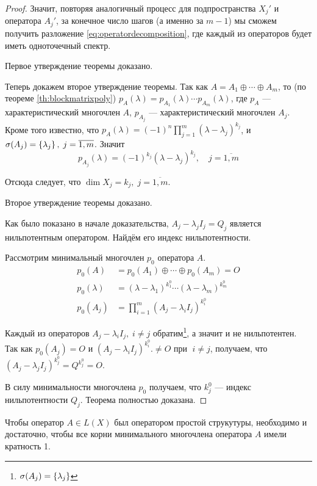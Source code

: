 \begin{proof}
    Значит, повторяя аналогичный процесс для подпространства $X_j'$ и оператора
    $A_j'$, за конечное число шагов (а именно за $m-1$) мы сможем получить разложение
    \eqref{eq:operatordecomposition}, где каждый из операторов будет иметь
    одноточечный спектр.

    Первое утверждение теоремы доказано.

    Теперь докажем второе утверждение теоремы.
    Так как $A = A_1 \oplus \dotsb \oplus A_m$, то (по теореме
    \ref{th:blockmatrixpoly})
    $p_A(\lambda) = p_{A_1}(\lambda)\dotsm p_{A_m}(\lambda)$, где $p_A$ —
    характеристический многочлен $A$, $p_{A_j}$ — характеристический многочлен
    $A_j$. Кроме того известно, что $p_A(\lambda) = (-1)^n
    \prod\limits_{j=1}^m(\lambda - \lambda_j)^{k_j}$, и $\operatorname{\sigma}(A_j) =
    \left\{\lambda_j\right\}, \; j = \overline{1,m}$. Значит
    \[ p_{A_j}(\lambda) = (-1)^{k_j} (\lambda - \lambda_j)^{k_j}, \quad j =
        \overline{1,m} \]

    Отсюда следует, что $\dim X_j = k_j, \; j = \overline{1,m}$. 
    
    Второе утверждение теоремы доказано.

    Как было показано в начале доказательства, 
    $A_j - \lambda_j I_j = Q_j$ является нильпотентным оператором.
    Найдём его индекс нильпотентности.

    Рассмотрим минимальный многочлен $p_0$ оператора $A$.
    \begin{align*}
        p_0(A) &= p_0(A_1) \oplus \dotsb \oplus p_0(A_m) = O \\
        p_0(\lambda) &= (\lambda - \lambda_1)^{k_1^0} \dotsm
        (\lambda-\lambda_m)^{k_m^0} \\
        p_0(A_j) &= \prod_{i=1}^m (A_j - \lambda_i I_j)^{k_i^0}
    \end{align*}

    Каждый из операторов $A_j - \lambda_i I_j, \; i \neq j$ обратим\footnote{
        $\operatorname{\sigma}(A_j) = \left\{\lambda_j\right\}$}, а значит и не нильпотентен. Так как
        $p_0(A_j) = O$ и $(A_j -\lambda_i I_j)^{k_i^0}. \neq O \text{ при } \; i \neq j$,
        получаем, что $(A_j - \lambda_j I_j)^{k_j^0} = Q^{k_j^0} = O$.

    В силу минимальности многочлена $p_0$ получаем, что $k_j^0$ — индекс
    нильпотентности $Q_j$. Теорема полностью доказана.
\end{proof}

\begin{theorem}
    Чтобы оператор $A\in L(X)$ был оператором простой струкутуры, необходимо и
    достаточно, чтобы все корни минимального многочлена оператора $A$ имели
    кратность 1.
\end{theorem}

